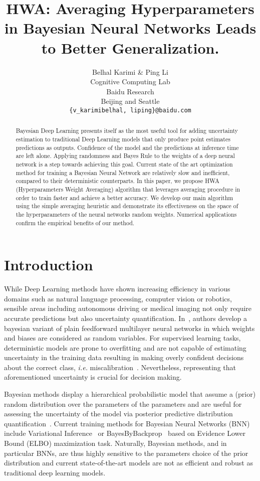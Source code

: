 \documentclass{article} %
\title{HWA: Averaging Hyperparameters in Bayesian Neural Networks Leads to Better Generalization.}
\author{Belhal Karimi \& Ping Li \\
Cognitive Computing Lab\\
Baidu Research\\
Beijing and Seattle \\
\texttt{\{v_karimibelhal, liping\}@baidu.com} \\
}
\begin{document}
\maketitle

\begin{abstract}
Bayesian Deep Learning presents itself as the most useful tool for adding uncertainty estimation to traditional Deep Learning models that only produce point estimates predictions as outputs.
Confidence of the model and the predictions at inference time are left alone.
Applying randomness and Bayes Rule to the weights of a deep neural network is a step towards achieving this goal.
Current state of the art optimization method for training a Bayesian Neural Network are relatively slow and inefficient, compared to their deterministic counterparts.
In this paper, we propose HWA (Hyperparameters Weight Averaging) algorithm that leverages averaging procedure in order to train faster and achieve a better accuracy.
We develop our main algorithm using the simple averaging heuristic and demonstrate its effectiveness on the space of the hyperparameters of the neural networks random weights.
Numerical applications confirm the empirical benefits of our method.
\end{abstract}

\section{Introduction}
While Deep Learning methods have shown increasing efficiency in various domains such as natural language processing, computer vision or robotics, sensible areas including autonomous driving or medical imaging not only require accurate predictions but also uncertainty quantification.
In~\citep{neal2012bayesian}, authors develop a bayesian variant of plain feedforward multilayer neural networks in which weights and biases are considered as random variables.
For supervised learning tasks, deterministic models are prone to overfitting and are not capable of estimating uncertainty in the training data resulting in making overly confident decisions about the correct class, \textit{i.e.} miscalibration~\citep{guo2017calibration,kendall2017uncertainties}.
Nevertheless, representing that aforementioned uncertainty is crucial for decision making.

Bayesian methods display a hierarchical probabilistic model that assume a (prior) random distribution over the parameters of the parameters and are useful for assessing the uncertainty of the model via posterior predictive distribution quantification~\citep{blundell2015weight,kingma2015variational}.
Current training methods for Bayesian Neural Networks (BNN)~\citep{neal2012bayesian} include Variational Inference~\citep{graves2011practical, hoffman2013stochastic} or BayesByBackprop~\citep{blundell2015weight} based on Evidence Lower Bound (ELBO) maximization task.
Naturally, Bayesian methods, and in particular BNNs, are thus highly sensitive to the parameters choice of the prior distribution and current state-of-the-art models are not as efficient and robust as traditional deep learning models.
\end{document}
